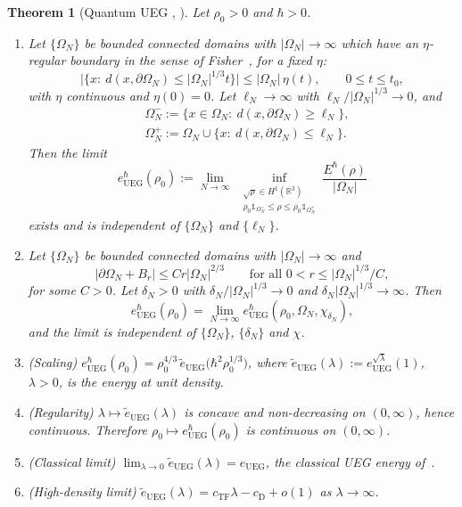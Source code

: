 \documentclass[final,reqno]{amsart}
\newtheorem{theorem}{Theorem}[section]
\theoremstyle{remark}
\theoremstyle{definition}
\renewcommand{\le}{\leqslant}
\renewcommand{\ge}{\geqslant}
\newcommand{\RR}{\mathbb{R}}
\newcommand{\iden}{\mathbb{1}}
\newcommand{\TF}{\mathrm{TF}}
\newcommand{\UEG}{\mathrm{UEG}}
\begin{document}
\begin{theorem}[Quantum UEG {\cite[Thm.~5.1]{lewin2018statistical}, \cite[Thm.~1]{lewin2020local}}]\label{thm:UEG}
Let $\rho_0>0$ and $\hbar>0$.
\begin{enumerate}
\item[(i)]  Let $\{\Omega_N\}$ be bounded connected domains with $|\Omega_N|\to\infty$ which have an $\eta$-regular boundary in the sense of Fisher~\cite{fisher1964free}, for a fixed $\eta$:
\[
\big|\{x:\ d(x,\partial\Omega_N)\le|\Omega_N|^{1/3}t\}\big|\le|\Omega_N|\,\eta(t),\qquad0\le t\le t_0,
\]
with $\eta$ continuous and $\eta(0)=0$. Let $\ell_N\to\infty$ with $\ell_N/|\Omega_N|^{1/3}\to0$, and
\begin{align*}
&\Omega_N^-:=\{x\in\Omega_N:\ d(x,\partial\Omega_N)\ge\ell_N\},\\
&\Omega_N^+:=\Omega_N\cup\{x:\ d(x,\partial\Omega_N)\le\ell_N\}.
\end{align*}
Then the limit
\begin{equation}\label{eq:UEG_LLS18}
\boxed{e^\hbar_\UEG(\rho_0):=\lim_{N\to\infty}\ \inf_{\substack{\sqrt\rho\in H^1(\RR^3)\\ \rho_0\iden_{\Omega_N^-}\le\rho\le\rho_0\iden_{\Omega_N^+}}}\frac{E^\hbar(\rho)}{|\Omega_N|}}
\end{equation}
exists and is independent of $\{\Omega_N\}$ and $\{\ell_N\}$.
\item[(ii)] Let $\{\Omega_N\}$ be bounded connected domains with $|\Omega_N|\to\infty$ and
\[
|\partial\Omega_N+B_r|\le Cr|\Omega_N|^{2/3}\qquad\text{for all }0<r\le|\Omega_N|^{1/3}/C,
\]
for some $C>0$. Let $\delta_N>0$ with $\delta_N/|\Omega_N|^{1/3}\to0$ and $\delta_N|\Omega_N|^{1/3}\to\infty$. Then
\begin{equation}\label{eq:UEG_LDA}
\boxed{e^\hbar_\UEG(\rho_0)=\lim_{N\to\infty}e^\hbar_\UEG(\rho_0,\Omega_N,\chi_{\delta_N}),}
\end{equation}
and the limit is independent of $\{\Omega_N\}$, $\{\delta_N\}$ and $\chi$.
\item[(iii)] (Scaling) $e^\hbar_\UEG(\rho_0)=\rho_0^{4/3}\,\tilde e_\UEG\big(\hbar^2\rho_0^{1/3}\big)$, where $\tilde e_\UEG(\lambda):=e^{\sqrt\lambda}_\UEG(1)$, $\lambda>0$, is the energy at unit density.
\item[(iv)] (Regularity) $\lambda\mapsto \tilde e_\UEG(\lambda)$ is concave and non-decreasing on $(0,\infty)$, hence continuous. Therefore $\rho_0\mapsto e^\hbar_\UEG(\rho_0)$ is continuous on $(0,\infty)$.
\item[(v)] (Classical limit) $\lim_{\lambda\to0}\tilde e_\UEG(\lambda)=e_\UEG$, the classical UEG energy of~\cite[Thm.~2.6]{lewin2018statistical}.
\item[(vi)] (High-density limit) $\tilde e_\UEG(\lambda)=c_\TF\lambda-c_{\mathrm{D}}+o(1)$ as $\lambda\to\infty$.
\end{enumerate}
\end{theorem}
\end{document}
